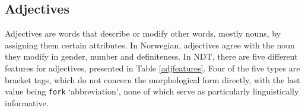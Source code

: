 \documentclass[a4paper,12pt,english]{book}
\begin{document}

\subsection{Adjectives}
Adjectives are words that describe or modify other words, mostly nouns, by
assigning them certain attributes. In Norwegian, adjectives agree with the noun
they modify in gender, number and definiteness. In NDT, there are five
different features for adjectives, presented in Table \ref{adjfeatures}. Four
of the five types are bracket tags, which do not concern the morphological form
directly, with the last value being \texttt{fork} `abbreviation', none of which
serve as particularly linguistically informative.
\end{document}
